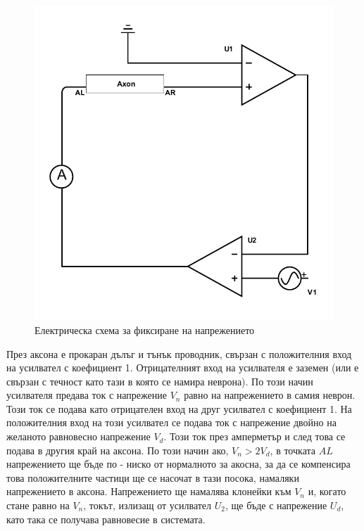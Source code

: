 \documentclass{article}
\numberwithin{equation}{section}
\begin{document}
        \begin{figure}[H]
            \centering
            \includegraphics[scale=0.6]{./schemas/voltage-clamp.pdf}
            \caption{Електрическа схема за фиксиране на напрежението}
        \end{figure}

        През аксона е прокаран дълъг и тънък проводник, свързан с положителния вход на усилвател с коефициент 1. Отрицателният вход на усилвателя
        е заземен (или е свързан с течност като тази в която се намира неврона). По този начин усилвателя предава ток с напрежение $V_n$ равно на
        напрежението в самия неврон. Този ток се подава като отрицателен вход на друг усилвател с коефициент 1. На положителния вход на този
        усилвател се подава ток с напрежение двойно на желаното равновесно напрежение $V_d$. Този ток през амперметър и след това се подава в
        другия край на аксона. По този начин ако, $V_n > 2V_d$, в точката $AL$ напрежението ще бъде по - ниско от нормалното за акосна, за да се
        компенсира това положителните частици ще се насочат в тази посока, намаляки напрежението в аксона. Напрежението ще намалява клонейки към
        $V_n$ и, когато стане равно на $V_n$, токът, излизащ от усилвател $U_2$, ще бъде с напрежение $U_d$, като така се получава равновесие в
        системата.
\end{document}
